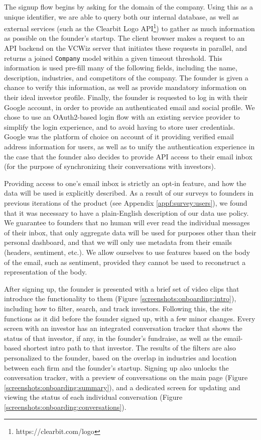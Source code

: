 The signup flow begins by asking for the domain of the company. Using this as a unique identifier, we are able to query both our internal database, as well as external services (such as the Clearbit Logo API\footnote{https://clearbit.com/logo}) to gather as much information as possible on the founder's startup. The client browser makes a request to an API backend on the VCWiz server that initiates these requests in parallel, and returns a joined \texttt{Company} model within a given timeout threshold. This information is used pre-fill many of the following fields, including the name, description, industries, and competitors of the company. The founder is given a chance to verify this information, as well as provide mandatory information on their ideal investor profile. Finally, the founder is requested to log in with their Google account, in order to provide an authenticated email and social profile. We chose to use an OAuth2-based \cite{hardt2012oauth} login flow with an existing service provider to simplify the login experience, and to avoid having to store user credentials. Google was the platform of choice on account of it providing verified email address information for users, as well as to unify the authentication experience in the case that the founder also decides to provide API access to their email inbox (for the purpose of synchronizing their conversations with investors).

Providing access to one's email inbox is strictly an opt-in feature, and how the data will be used is explicitly described. As a result of our surveys to founders in previous iterations of the product (see Appendix \ref{appf:survey:users}), we found that it was necessary to have a plain-English description of our data use policy. We guarantee to founders that no human will ever read the individual messages of their inbox, that only aggregate data will be used for purposes other than their personal dashboard, and that we will only use metadata from their emails (headers, sentiment, etc.).  We allow ourselves to use features based on the body of the email, such as sentiment, provided they cannot be used to reconstruct a representation of the body.

After signing up, the founder is presented with a brief set of video clips that introduce the functionality to them (Figure \ref{screenshots:onboarding:intro}), including how to filter, search, and track investors. Following this, the site functions as it did before the founder signed up, with a few minor changes. Every screen with an investor has an integrated conversation tracker that shows the status of that investor, if any, in the founder's fundraise, as well as the email-based shortest intro path to that investor. The results of the filters are also personalized to the founder, based on the overlap in industries and location between each firm and the founder's startup. Signing up also unlocks the conversation tracker, with a preview of conversations on the main page (Figure \ref{screenshots:onboarding:summary}), and a dedicated screen for updating and viewing the status of each individual conversation (Figure \ref{screenshots:onboarding:conversations}).

